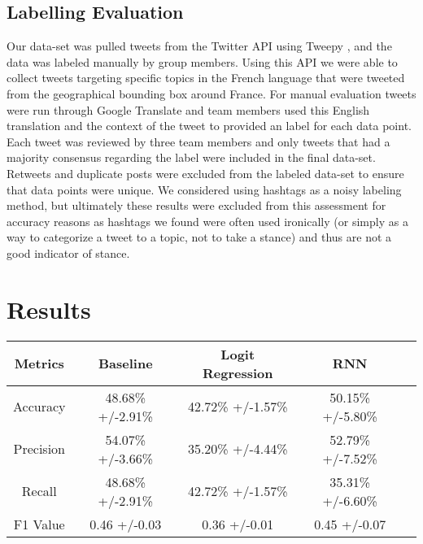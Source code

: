 \documentclass[journal]{IEEEtran}
\begin{document}
\subsection{Labelling Evaluation}
Our data-set was pulled tweets from the Twitter API \cite{Twitter_API} using Tweepy \cite{tweepy}, and the data was labeled manually by group members. Using this API we were able to collect tweets targeting specific topics in the French language that were tweeted from the geographical bounding box around France. For manual evaluation tweets were run through Google Translate and team members used this English translation and the context of the tweet to provided an label for each data point. Each tweet was reviewed by three team members and only tweets that had a majority consensus regarding the label were included in the final data-set. Retweets and duplicate posts were excluded from the labeled data-set to ensure that data points were unique. We considered using hashtags as a noisy labeling method, but ultimately these results were excluded from this assessment for accuracy reasons as hashtags we found were often used ironically (or simply as a way to categorize a tweet to a topic, not to take a stance) and thus are not a good indicator of stance. 




\clearpage


\section{Results}

\begin{center}
 \label{tab:title2}
\begin{tabular}{ | c | c | c | c | c |}
\hline
Metrics & Baseline & Logit Regression & RNN\\[0.7ex]
\hline
Accuracy & 48.68\% +/-2.91\% & 42.72\% +/-1.57\% & 50.15\% +/-5.80\% \\
Precision & 54.07\% +/-3.66\% & 35.20\% +/-4.44\% & 52.79\% +/-7.52\% \\
Recall & 48.68\% +/-2.91\% & 42.72\% +/-1.57\% & 35.31\% +/-6.60\% \\
F1 Value & 0.46 +/-0.03 & 0.36 +/-0.01 & 0.45 +/-0.07 \\ [1ex]
\hline
\end{tabular}
\end{center}
\end{document}
